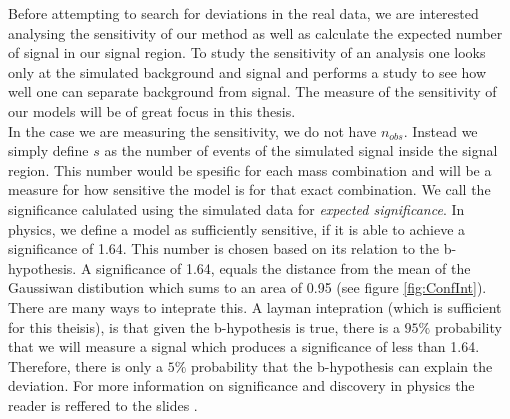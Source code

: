 Before attempting to search for deviations in the real data, we are interested analysing the sensitivity of our method as well 
as calculate the expected number of signal in our signal region. To study the sensitivity of an analysis one looks only at the 
simulated background and signal and performs a study to see how well one can separate background from signal. The measure of the sensitivity 
of our models will be of great focus in this thesis.
\\
In the case we are measuring the sensitivity, we do not have $n_{obs}$. Instead we simply define $s$ as the number of events of the simulated signal 
inside the signal region. This number would be spesific for each mass combination and will be a measure for how sensitive 
the model is for that exact combination. We call the significance calulated using the simulated data for \emph{expected significance}. 
In physics, we define a model as sufficiently sensitive, if it is able to achieve a significance of 1.64. This number is chosen based on 
its relation to the b-hypothesis. A significance of 1.64, equals the distance from the mean of the Gaussiwan distibution which sums to an area of 
0.95 (see figure \ref{fig:ConfInt}). There are many ways to inteprate this. A layman intepration (which is sufficient for this theisis), is 
that given the b-hypothesis is true, there is a $95\%$ probability that we will measure a signal which produces a significance of less than 
1.64. Therefore, there is only a $5\%$ probability that the b-hypothesis can explain the deviation. For more information on significance and 
discovery in physics the reader is reffered to the slides \cite{magnar}.